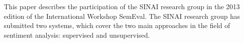 This paper describes the participation of the SINAI research group in the 2013 edition of the International Workshop SemEval. The SINAI research group has
 submitted two systems, which cover the two main approaches in the field of
 sentiment analysis: supervised and unsupervised.

